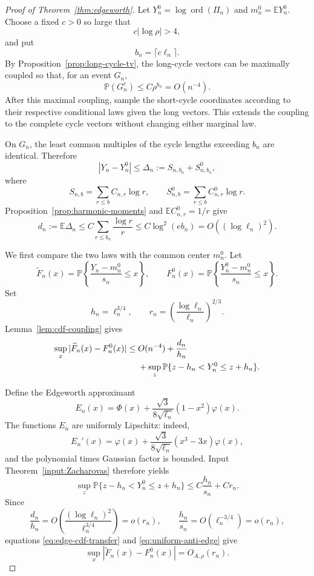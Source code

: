 \documentclass[11pt]{article}
\theoremstyle{definition}
\theoremstyle{remark}
\newcommand{\Pp}{\mathbb P}
\newcommand{\Ee}{\mathbb E}
\newcommand{\ord}{\operatorname{ord}}
\begin{document}
\begin{proof}[Proof of Theorem~\ref{thm:edgeworth}]
Let $Y_n^0=\log\ord(\Pi_n)$ and $m_n^0=\Ee Y_n^0$.  Choose a fixed
$c>0$ so large that
\[
 c|\log\rho|>4,
\]
and put
\[
 b_n=\lceil c\ell_n\rceil.
\]
By Proposition~\ref{prop:long-cycle-tv}, the long-cycle vectors can be
maximally coupled so that, for an event $G_n$,
\begin{equation}\label{eq:edge-coupling-failure}
 \Pp(G_n^c)\le C\rho^{b_n}=O(n^{-4}).
\end{equation}
After this maximal coupling, sample the short-cycle coordinates according
to their respective conditional laws given the long vectors.  This
extends the coupling to the complete cycle vectors without changing either
marginal law.

On $G_n$, the least common multiples of the cycle lengths exceeding $b_n$
are identical.  Therefore
\begin{equation}\label{eq:edge-coupling-size}
 |Y_n-Y_n^0|
 \le
 \Delta_n:=S_{n,b_n}+S_{n,b_n}^0,
\end{equation}
where
\[
 S_{n,b}=
 \sum_{r\le b}C_{n,r}\log r,
 \qquad
 S_{n,b}^0=
 \sum_{r\le b}C_{n,r}^0\log r.
\]
Proposition~\ref{prop:harmonic-moments} and
$\Ee C_{n,r}^0=1/r$ give
\begin{equation}\label{eq:edge-short-mean}
 d_n:=\Ee\Delta_n
 \le C\sum_{r\le b_n}\frac{\log r}{r}
 \le C\log^2(e b_n)
 =O((\log\ell_n)^2).
\end{equation}

We first compare the two laws with the common center $m_n^0$.  Let
\[
 \widetilde F_n(x)=
 \Pp\left\{\frac{Y_n-m_n^0}{s_n}\le x\right\},
 \qquad
 F_n^0(x)=
 \Pp\left\{\frac{Y_n^0-m_n^0}{s_n}\le x\right\}.
\]
Set
\[
 h_n=\ell_n^{3/4},
 \qquad
 r_n=\left(\frac{\log\ell_n}{\ell_n}\right)^{2/3}.
\]
Lemma~\ref{lem:cdf-coupling} gives
\begin{align}
 \sup_x|\widetilde F_n(x)-F_n^0(x)|
 \le{}& O(n^{-4})+\frac{d_n}{h_n}
 \notag\\
 &+\sup_z\Pp\{z-h_n<Y_n^0\le z+h_n\}.
 \label{eq:edge-cdf-transfer}
\end{align}

Define the Edgeworth approximant
\[
 E_n(x)=
 \Phi(x)+
 \frac{\sqrt3}{8\sqrt{\ell_n}}(1-x^2)\varphi(x).
\]
The functions $E_n$ are uniformly Lipschitz: indeed,
\[
 E_n'(x)=
 \varphi(x)+
 \frac{\sqrt3}{8\sqrt{\ell_n}}(x^3-3x)\varphi(x),
\]
and the polynomial times Gaussian factor is bounded.  Input
Theorem~\ref{input:Zacharovas} therefore yields
\begin{equation}\label{eq:uniform-anti-edge}
 \sup_z\Pp\{z-h_n<Y_n^0\le z+h_n\}
 \le
 C\frac{h_n}{s_n}+Cr_n.
\end{equation}
Since
\[
 \frac{d_n}{h_n}
 =O\!\left(\frac{(\log\ell_n)^2}{\ell_n^{3/4}}\right)
 =o(r_n),
 \qquad
 \frac{h_n}{s_n}=O(\ell_n^{-3/4})=o(r_n),
\]
equations \eqref{eq:edge-cdf-transfer} and
\eqref{eq:uniform-anti-edge} give
\begin{equation}\label{eq:edge-common-center}
 \sup_x|\widetilde F_n(x)-F_n^0(x)|=O_{A,\rho}(r_n).
\end{equation}


\end{proof}
\end{document}

